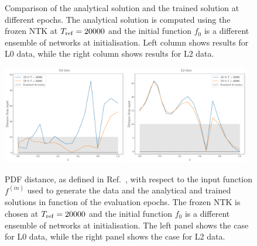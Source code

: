 \begin{figure}[ht!]
    \caption{Comparison of the analytical solution and the trained solution at
    different epochs. The analytical solution is computed using the frozen NTK
    at $T_{\rm ref} = 20000$ and the initial function $f_0$ is a different
    ensemble of networks at initialisation. Left column shows results for L0
    data, while the right column shows results for L2 data.}
    \label{fig:xT3_analytical_vs_trained}
  \end{figure}

  \begin{figure}[ht!]
    \centering
    \includegraphics[width=0.48\textwidth]{plots/analytical_solution/distance_plot_from_fin_L0.pdf}
    \includegraphics[width=0.48\textwidth]{plots/analytical_solution/distance_plot_from_fin_L2.pdf}
    \caption{PDF distance, as defined in Ref.~\cite{NNPDF:2021njg}, with respect to
    the input function $f^{(in)}$ used to generate the data and the analytical and trained
    solutions in function of the evaluation epochs. The frozen NTK
    is chosen at $T_{\rm ref} = 20000$ and the initial function $f_0$ is a different
    ensemble of networks at initialisation. The left panel shows the case for L0 data,
    while the right panel shows the case for L2 data.}
    \label{fig:xT3_distance_L0_L2}
  \end{figure}


